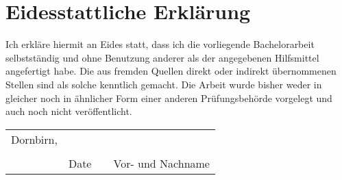 \chapter*{Eidesstattliche Erklärung}

Ich erkläre hiermit an Eides statt, dass ich die vorliegende Bachelorarbeit
selbstständig und ohne Benutzung anderer als der angegebenen Hilfsmittel
angefertigt habe. Die aus fremden Quellen direkt oder indirekt übernommenen
Stellen sind als solche kenntlich gemacht. Die Arbeit wurde bisher weder in
gleicher noch in ähnlicher Form einer anderen Prüfungsbehörde vorgelegt und
auch noch nicht veröffentlicht.

\vfill

\newcommand{\mysignatureblock}[3]{%
  \begin{tabular}{llp{2em}l}
  #1 & \hspace{4cm}        & & \hspace{5cm} \\\cline{2-2}\cline{4-4}
     &                     & & \\[-3mm]
     & {\footnotesize #2}  & & {\footnotesize #3}
  \end{tabular}
}

\mysignatureblock{Dornbirn,}{Date}{Vor- und Nachname}

\vfill\vfill
